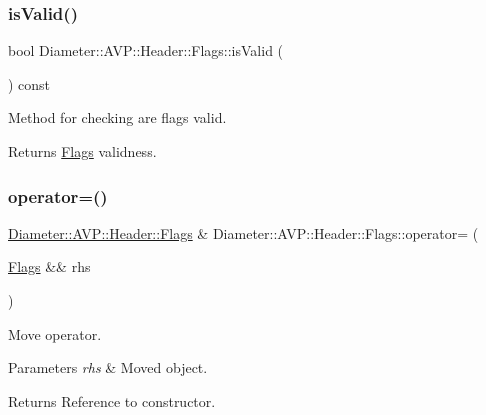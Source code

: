 \subsubsection{\texorpdfstring{is\+Valid()}{isValid()}}
{\footnotesize\ttfamily bool Diameter\+::\+A\+V\+P\+::\+Header\+::\+Flags\+::is\+Valid (\begin{DoxyParamCaption}{ }\end{DoxyParamCaption}) const}



Method for checking are flags valid. 

\begin{DoxyReturn}{Returns}
\hyperlink{classDiameter_1_1AVP_1_1Header_1_1Flags}{Flags} validness. 
\end{DoxyReturn}
\mbox{\label{classDiameter_1_1AVP_1_1Header_1_1Flags_aef292134b9d9f7c46a382ffdf95327ba}} 
\subsubsection{\texorpdfstring{operator=()}{operator=()}\hspace{0.1cm}{\footnotesize\ttfamily [1/2]}}
{\footnotesize\ttfamily \hyperlink{classDiameter_1_1AVP_1_1Header_1_1Flags}{Diameter\+::\+A\+V\+P\+::\+Header\+::\+Flags} \& Diameter\+::\+A\+V\+P\+::\+Header\+::\+Flags\+::operator= (\begin{DoxyParamCaption}\item[{\hyperlink{classDiameter_1_1AVP_1_1Header_1_1Flags}{Flags} \&\&}]{rhs }\end{DoxyParamCaption})\hspace{0.3cm}{\ttfamily [noexcept]}}



Move operator. 


\begin{DoxyParams}{Parameters}
{\em rhs} & Moved object. \\
\hline
\end{DoxyParams}
\begin{DoxyReturn}{Returns}
Reference to constructor. 
\end{DoxyReturn}
\mbox{\label{classDiameter_1_1AVP_1_1Header_1_1Flags_a8a630e537a7e2135c032a2f94fcb59ea}} 
